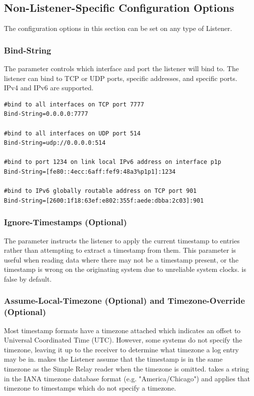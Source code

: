 \subsection{Non-Listener-Specific Configuration Options}

The configuration options in this section can be set on any type of
Listener.

\subsubsection*{Bind-String}

The  parameter controls which interface and port the
listener will bind to. The listener can bind to TCP or UDP ports,
specific addresses, and specific ports. IPv4 and IPv6 are supported.

\begin{Verbatim}[breaklines=true]
#bind to all interfaces on TCP port 7777
Bind-String=0.0.0.0:7777

#bind to all interfaces on UDP port 514
Bind-String=udp://0.0.0.0:514

#bind to port 1234 on link local IPv6 address on interface p1p
Bind-String=[fe80::4ecc:6aff:fef9:48a3%p1p1]:1234

#bind to IPv6 globally routable address on TCP port 901
Bind-String=[2600:1f18:63ef:e802:355f:aede:dbba:2c03]:901
\end{Verbatim}

\subsubsection*{Ignore-Timestamps (Optional)}

The  parameter instructs the listener to apply the
current timestamp to entries rather than attempting to extract a
timestamp from them. This parameter is useful when reading data where
there may not be a timestamp present, or the timestamp is wrong on the
originating system due to unreliable system clocks.
 is false by default.

\subsubsection{Assume-Local-Timezone (Optional) and Timezone-Override (Optional)}

Most timestamp formats have a timezone attached which indicates an
offset to Universal Coordinated Time (UTC). However, some systems do not
specify the timezone, leaving it up to the receiver to determine what
timezone a log entry may be in.  makes the
Listener assume that the timestamp is in the same timezone as the Simple
Relay reader when the timezone is omitted.  takes a
string in the IANA timezone database format (e.g. "America/Chicago") and
applies that timezone to timestamps which do not specify a timezone.

